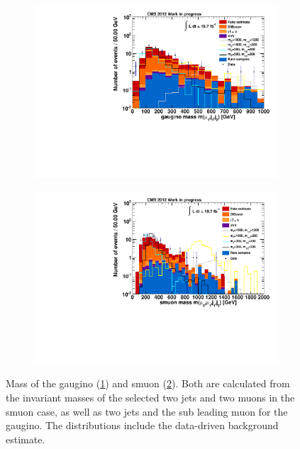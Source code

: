 \begin{figure}[htb!]
  \centering
  \begin{subfigure}[b]{0.495\textwidth}
    \centering
    \includegraphics[width=\textwidth]{plots/m_gaugino.pdf}
    \caption{\label{fig:m_gaugino}}
  \end{subfigure}
  \begin{subfigure}[b]{0.495\textwidth}
    \centering
    \includegraphics[width=\textwidth]{plots/m_smuon.pdf}
    \caption{\label{fig:m_smuon}}
  \end{subfigure}
  \caption{Mass of the gaugino (\ref{fig:m_gaugino}) and smuon (\ref{fig:m_smuon}). Both are calculated from the invariant masses of the selected two jets and two muons in the smuon case, as well as two jets and the sub leading muon for the gaugino. The distributions include the data-driven background estimate.}
  \label{fig:final-dist}
\end{figure}


